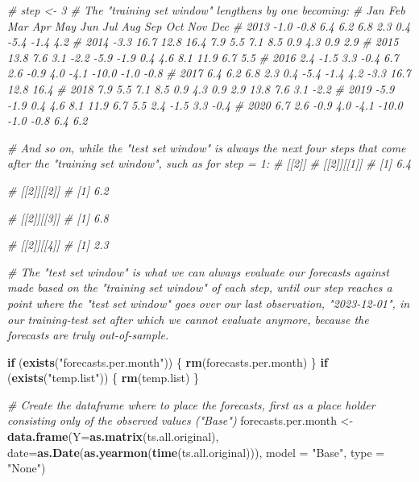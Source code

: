 \documentclass[
]{article}
\newenvironment{Shaded}{\begin{snugshade}}{\end{snugshade}}
\newcommand{\AttributeTok}[1]{\textcolor[rgb]{0.13,0.29,0.53}{#1}}
\newcommand{\CommentTok}[1]{\textcolor[rgb]{0.56,0.35,0.01}{\textit{#1}}}
\newcommand{\ControlFlowTok}[1]{\textcolor[rgb]{0.13,0.29,0.53}{\textbf{#1}}}
\newcommand{\FunctionTok}[1]{\textcolor[rgb]{0.13,0.29,0.53}{\textbf{#1}}}
\newcommand{\NormalTok}[1]{#1}
\newcommand{\OtherTok}[1]{\textcolor[rgb]{0.56,0.35,0.01}{#1}}
\newcommand{\StringTok}[1]{\textcolor[rgb]{0.31,0.60,0.02}{#1}}
\begin{document}
\begin{Shaded}
\begin{Highlighting}[]
  \CommentTok{\# step \textless{}{-} 3 \# The "training set window" lengthens by one becoming:}
  \CommentTok{\#         Jan   Feb   Mar   Apr   May   Jun   Jul   Aug   Sep   Oct   Nov   Dec}
  \CommentTok{\# 2013              {-}1.0  {-}0.8   6.4   6.2   6.8   2.3   0.4  {-}5.4  {-}1.4   4.2}
  \CommentTok{\# 2014  {-}3.3  16.7  12.8  16.4   7.9   5.5   7.1   8.5   0.9   4.3   0.9   2.9}
  \CommentTok{\# 2015  13.8   7.6   3.1  {-}2.2  {-}5.9  {-}1.9   0.4   4.6   8.1  11.9   6.7   5.5}
  \CommentTok{\# 2016   2.4  {-}1.5   3.3  {-}0.4   6.7   2.6  {-}0.9   4.0  {-}4.1 {-}10.0  {-}1.0  {-}0.8}
  \CommentTok{\# 2017   6.4   6.2   6.8   2.3   0.4  {-}5.4  {-}1.4   4.2  {-}3.3  16.7  12.8  16.4}
  \CommentTok{\# 2018   7.9   5.5   7.1   8.5   0.9   4.3   0.9   2.9  13.8   7.6   3.1  {-}2.2}
  \CommentTok{\# 2019  {-}5.9  {-}1.9   0.4   4.6   8.1  11.9   6.7   5.5   2.4  {-}1.5   3.3  {-}0.4}
  \CommentTok{\# 2020   6.7   2.6  {-}0.9   4.0  {-}4.1 {-}10.0  {-}1.0  {-}0.8   6.4   6.2}

  \CommentTok{\# And so on, while the "test set window" is always the next four steps that come after the "training set window", such as for step = 1:}
  \CommentTok{\# [[2]]}
  \CommentTok{\# [[2]][[1]]}
  \CommentTok{\# [1] 6.4}

  \CommentTok{\# [[2]][[2]]}
  \CommentTok{\# [1] 6.2}

  \CommentTok{\# [[2]][[3]]}
  \CommentTok{\# [1] 6.8}

  \CommentTok{\# [[2]][[4]]}
  \CommentTok{\# [1] 2.3}

  \CommentTok{\# The "test set window" is what we can always evaluate our forecasts against made based on the "training set window" of each step, until our step reaches a point where the "test set window" goes over our last observation, "2023{-}12{-}01", in our training{-}test set after which we cannot evaluate anymore, because the forecasts are truly out{-}of{-}sample.}

  \ControlFlowTok{if}\NormalTok{ (}\FunctionTok{exists}\NormalTok{(}\StringTok{"forecasts.per.month"}\NormalTok{)) \{}
    \FunctionTok{rm}\NormalTok{(forecasts.per.month)}
\NormalTok{  \}}
  \ControlFlowTok{if}\NormalTok{ (}\FunctionTok{exists}\NormalTok{(}\StringTok{"temp.list"}\NormalTok{)) \{}
    \FunctionTok{rm}\NormalTok{(temp.list)}
\NormalTok{  \}}

  \CommentTok{\# Create the dataframe where to place the forecasts, first as a place holder consisting only of the observed values ("Base")}
\NormalTok{  forecasts.per.month }\OtherTok{\textless{}{-}} \FunctionTok{data.frame}\NormalTok{(}\AttributeTok{Y=}\FunctionTok{as.matrix}\NormalTok{(ts.all.original), }\AttributeTok{date=}\FunctionTok{as.Date}\NormalTok{(}\FunctionTok{as.yearmon}\NormalTok{(}\FunctionTok{time}\NormalTok{(ts.all.original))), }\AttributeTok{model =} \StringTok{"Base"}\NormalTok{, }\AttributeTok{type =} \StringTok{"None"}\NormalTok{)}


\end{Highlighting}
\end{Shaded}
\end{document}

